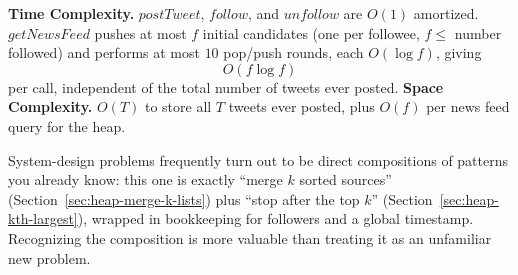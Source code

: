 \begin{complexitybox}
\textbf{Time Complexity.} $\textit{postTweet}$, $\textit{follow}$, and
$\textit{unfollow}$ are $O(1)$ amortized. $\textit{getNewsFeed}$ pushes at
most $f$ initial candidates (one per followee, $f \le$ number followed)
and performs at most $10$ pop/push rounds, each $O(\log f)$, giving
\[
  O(f \log f)
\]
per call, independent of the total number of tweets ever posted.
\textbf{Space Complexity.} $O(T)$ to store all $T$ tweets ever posted,
plus $O(f)$ per news feed query for the heap.
\end{complexitybox}

\begin{takeawaybox}
System-design problems frequently turn out to be direct compositions of
patterns you already know: this one is exactly ``merge $k$ sorted
sources'' (Section~\ref{sec:heap-merge-k-lists}) plus ``stop after the
top $k$'' (Section~\ref{sec:heap-kth-largest}), wrapped in bookkeeping for
followers and a global timestamp. Recognizing the composition is more
valuable than treating it as an unfamiliar new problem.
\end{takeawaybox}
